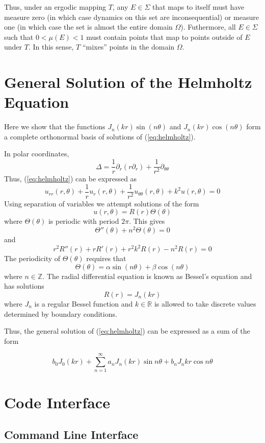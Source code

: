 \documentclass{report}
\begin{document}
Thus, under an ergodic mapping $T$, any $E \in \Sigma$ that maps to itself must have measure zero (in which case dynamics on this set are inconsequential) or measure one (in which case the set is almost the entire domain $\Omega$). Futhermore, all $E \in \Sigma$ such that $0 < \mu(E) < 1$ must contain points that map to points outside of $E$ under $T$. In this sense, $T$ ``mixes'' points in the domain $\Omega$.

\chapter{General Solution of the Helmholtz Equation}
\label{sec:helmholtz_basis}
Here we show that the functions $J_{n}(k r) \sin(n \theta)$ and $J_{n}(k r) \cos(n \theta)$ form a complete orthonormal basis of solutions of (\ref{eq:helmholtz}).

In polar coordinates,
\[
\Delta = \frac{1}{r} \partial_{r} (r \partial_{r}) + \frac{1}{r^{2}} \partial_{\theta \theta}
\]
Thus, (\ref{eq:helmholtz}) can be expressed as
\[
u_{rr}(r, \theta) + \frac{1}{r} u_{r}(r, \theta) + \frac{1}{r^{2}} u_{\theta \theta}(r, \theta) + k^2 u(r, \theta) = 0
\]
Using separation of variables we attempt solutions of the form
\[
u(r, \theta) = R(r) \Theta(\theta)
\]
where $\Theta(\theta)$ is periodic with period $2 \pi$. This gives
\[
\Theta''(\theta) + n^{2} \Theta(\theta) = 0
\]
and
\[
r^{2} R''(r) + r R'(r) + r^{2} k^{2} R(r) - n^{2} R(r) = 0
\]
The periodicity of $\Theta(\theta)$ requires that
\[
\Theta(\theta) = \alpha \sin(n \theta) + \beta \cos(n \theta)
\]
where $n \in \mathbb{Z}$.
The radial differential equation is known as Bessel's equation and has solutions
\[
R(r) = J_{n}(k r)
\]
where $J_{n}$ is a regular Bessel function and $k \in \mathbb{R}$ is allowed to take discrete values determined by boundary conditions.

Thus, the general solution of (\ref{eq:helmholtz}) can be expressed as a sum of the form

\begin{equation}
  \label{eq:helmholtz_gen_soln}
  b_{0} J_{0}(kr) + \sum_{n = 1}^{\infty}{a_{n} J_n(kr) \sin{n \theta} + b_{n} J_n{kr} \cos{n \theta}}
\end{equation}



\chapter{Code Interface}
\label{sec:api}
\section{Command Line Interface}
\end{document}

